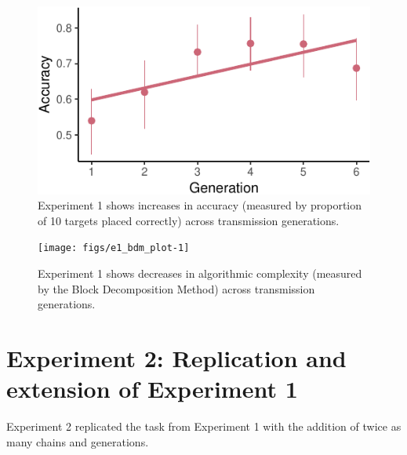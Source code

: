 \documentclass[10pt, letterpaper]{article}
\newenvironment{CodeChunk}{}{}
\begin{document}
\begin{CodeChunk}
\begin{figure}[tb]

{\centering \includegraphics{figs/e1_acc_plot-1} 

}

\caption[Experiment 1 shows increases in accuracy (measured by proportion of 10 targets placed correctly) across transmission generations]{Experiment 1 shows increases in accuracy (measured by proportion of 10 targets placed correctly) across transmission generations.}\label{fig:e1_acc_plot}
\end{figure}
\end{CodeChunk}

\begin{CodeChunk}
\begin{figure}[tb]

{\centering \texttt{[image: figs/e1\_bdm\_plot-1]} 

}

\caption[Experiment 1 shows decreases in algorithmic complexity (measured by the Block Decomposition Method) across transmission generations]{Experiment 1 shows decreases in algorithmic complexity (measured by the Block Decomposition Method) across transmission generations.}\label{fig:e1_bdm_plot}
\end{figure}
\end{CodeChunk}

\section{Experiment 2: Replication and extension of Experiment
1}\label{experiment-2-replication-and-extension-of-experiment-1}

Experiment 2 replicated the task from Experiment 1 with the addition of
twice as many chains and generations.
\end{document}
